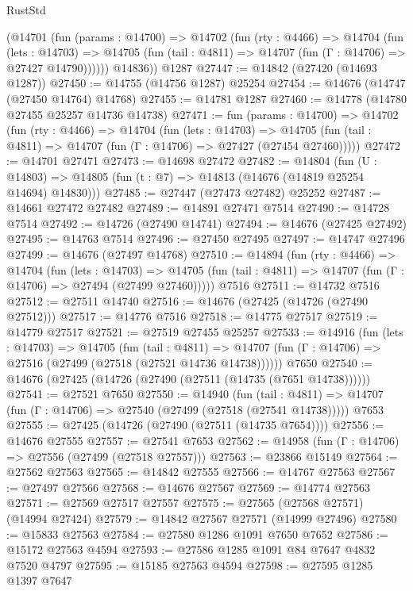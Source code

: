 \begin{lexlean}{RustStd}
\begin{coremodule}
        (@14701
          (fun (params : @14700) =>
          @14702
            (fun (rty : @4466) =>
            @14704
              (fun (lets : @14703) =>
              @14705 (fun (tail : @4811) => @14707 (fun (Γ : @14706) => @27427 @14790))))))
        @14836))
    @1287
@27447 := @14842 (@27420 (@14693 @1287))
@27450 := @14755 (@14756 @1287) @25254
@27454 := @14676 (@14747 (@27450 @14764) @14768)
@27455 := @14781 @1287
@27460 := @14778 (@14780 @27455 @25257 @14736 @14738)
@27471 := fun (params : @14700) =>
  @14702
    (fun (rty : @4466) =>
    @14704
      (fun (lets : @14703) =>
      @14705 (fun (tail : @4811) => @14707 (fun (Γ : @14706) => @27427 (@27454 @27460)))))
@27472 := @14701 @27471
@27473 := @14698 @27472
@27482 := @14804
    (fun (U : @14803) => @14805 (fun (t : @7) => @14813 (@14676 (@14819 @25254 @14694) @14830)))
@27485 := @27447 (@27473 @27482) @25252
@27487 := @14661 @27472 @27482
@27489 := @14891 @27471 @7514
@27490 := @14728 @7514
@27492 := @14726 (@27490 @14741)
@27494 := @14676 (@27425 @27492)
@27495 := @14763 @7514
@27496 := @27450 @27495
@27497 := @14747 @27496
@27499 := @14676 (@27497 @14768)
@27510 := @14894
    (fun (rty : @4466) =>
    @14704
      (fun (lets : @14703) =>
      @14705 (fun (tail : @4811) => @14707 (fun (Γ : @14706) => @27494 (@27499 @27460)))))
    @7516
@27511 := @14732 @7516
@27512 := @27511 @14740
@27516 := @14676 (@27425 (@14726 (@27490 @27512)))
@27517 := @14776 @7516
@27518 := @14775 @27517
@27519 := @14779 @27517
@27521 := @27519 @27455 @25257
@27533 := @14916
    (fun (lets : @14703) =>
    @14705
      (fun (tail : @4811) =>
      @14707 (fun (Γ : @14706) => @27516 (@27499 (@27518 (@27521 @14736 @14738))))))
    @7650
@27540 := @14676 (@27425 (@14726 (@27490 (@27511 (@14735 (@7651 @14738))))))
@27541 := @27521 @7650
@27550 := @14940
    (fun (tail : @4811) => @14707 (fun (Γ : @14706) => @27540 (@27499 (@27518 (@27541 @14738)))))
    @7653
@27555 := @27425 (@14726 (@27490 (@27511 (@14735 @7654))))
@27556 := @14676 @27555
@27557 := @27541 @7653
@27562 := @14958 (fun (Γ : @14706) => @27556 (@27499 (@27518 @27557)))
@27563 := @23866 @15149
@27564 := @27562 @27563
@27565 := @14842 @27555
@27566 := @14767 @27563
@27567 := @27497 @27566
@27568 := @14676 @27567
@27569 := @14774 @27563
@27571 := @27569 @27517 @27557
@27575 := @27565 (@27568 @27571) (@14994 @27424)
@27579 := @14842 @27567 @27571 (@14999 @27496)
@27580 := @15833 @27563
@27584 := @27580 @1286 @1091 @7650 @7652
@27586 := @15172 @27563 @4594
@27593 := @27586 @1285 @1091 @84 @7647 @4832 @7520 @4797
@27595 := @15185 @27563 @4594
@27598 := @27595 @1285 @1397 @7647

\end{coremodule}
\end{lexlean}

